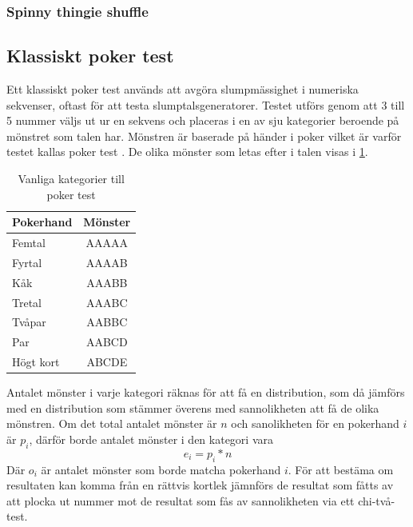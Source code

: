 \documentclass[swedish,a4paper]{article}
\begin{document}
\subsubsection{Spinny thingie shuffle}



\subsection{Klassiskt poker test}
\label{sec:poker_test}
Ett klassiskt poker test används att avgöra slump\-mässighet i numeriska 
sekvenser, oftast för att testa slumptalsgeneratorer. Testet utförs genom
att 3 till 5 nummer väljs ut ur en sekvens och placeras i en av sju
kategorier beroende på mönstret som talen har.  Mönstren är baserade på händer i poker vilket är varför testet kallas poker test \parencite{Abdel2014}. 
De olika mönster som letas efter i talen visas i \cref{tab:num_poker_hands}.

\begin{table}[H] %
	\centering
        \caption{Vanliga kategorier till poker test}
        \label{tab:num_poker_hands}
	\begin{tabular}{|l|c|}
	\hline 
	Pokerhand & Mönster \\ \hline  
	Femtal & AAAAA \\ \hline
	Fyrtal & AAAAB \\ \hline
	Kåk & AAABB \\ \hline
	Tretal & AAABC \\ \hline
	Tvåpar & AABBC \\ \hline
	Par & AABCD \\ \hline
	Högt kort & ABCDE \\ \hline
	
\end{tabular}

\end{table}
 Antalet mönster i varje kategori räknas för att få en distribution, som
 då jämförs med en distribution som stämmer överens med sannolikheten
 att få de olika mönstren. Om det total antalet mönster är $n$ och
 sanolikheten för en pokerhand $i$ är $p_i$, därför borde antalet mönster i
 den kategori vara $$e_i = p_i * n$$ Där $o_i$ är antalet mönster som
 borde matcha pokerhand $i$. För att bestäma om resultaten kan komma
 från en rättvis kortlek jämnförs de resultat som fåtts av att plocka
 ut nummer mot de resultat som fås av sannolikheten via ett chi-två-test.

\begin{equation*}
\end{equation*}
\end{document}

